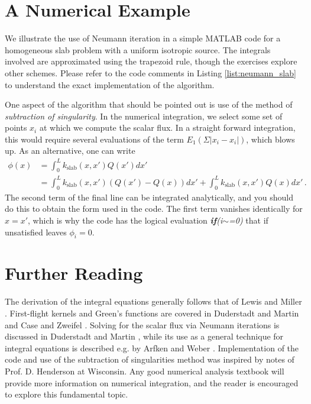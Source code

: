 \section*{A Numerical Example}

We illustrate the use of Neumann iteration in a simple MATLAB code for a homogeneous slab problem with a uniform isotropic source.  The integrals involved are approximated using the trapezoid rule, though the exercises explore other schemes.  Please refer to the code comments in Listing \ref{list:neumann_slab} to understand the exact implementation of the algorithm.

One aspect of the algorithm that should be pointed out is use of the method of \textit{subtraction of singularity}.  In the numerical integration, we select some set of points $x_i$ at which we compute the scalar flux.  In a straight forward integration, this would require several evaluations of the term $E_1(\Sigma|x_i-x_i|)$, which blows up.  As an alternative, one can write
\begin{equation}
\begin{split}
  \phi(x) &= \int^L_0 k_{\text{slab}}(x,x') Q(x')dx' \\
          &= \int^L_0 k_{\text{slab}}(x,x') (Q(x')-Q(x))dx' +  \int^L_0 k_{\text{slab}}(x,x') Q(x)dx'  \, .
\end{split}
\end{equation}
The second term of the final line can be integrated analytically, and you should do this to obtain the form used in the code.  The first term vanishes identically for $x=x'$, which is why the code has the logical evaluation \textsl{\textbf{if}(i$\sim$=0)} that if unsatisfied leaves $\phi_i = 0$.




\section*{Further Reading}

The derivation of the integral equations generally follows that of Lewis and Miller \cite{lewis1993cmn}.  First-flight kernels and Green's functions are covered in Duderstadt and Martin \cite{duderstadt1976tt} and Case and Zweifel \cite{case1967ltt}.  Solving for the scalar flux via Neumann iterations is discussed in Duderstadt and Martin \cite{duderstadt1976tt}, while its use as a general technique for integral equations is described e.g. by Arfken and Weber \cite{arfken1995mmp}.  Implementation of the code and use of the subtraction of singularities method was inspired by notes of Prof. D. Henderson at Wisconsin. Any good numerical analysis textbook will provide more information on numerical integration, and the reader is encouraged to explore this fundamental topic.    

